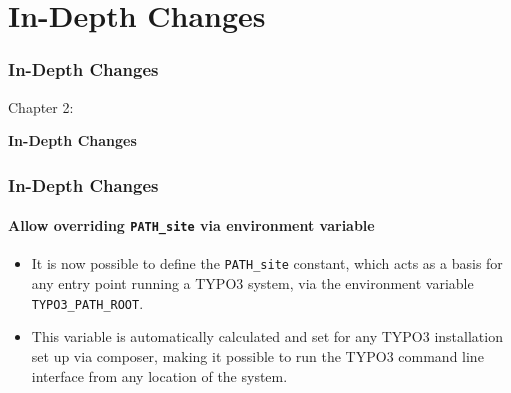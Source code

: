 %

\section{In-Depth Changes}
\begin{frame}[fragile]
	\frametitle{In-Depth Changes}

	\begin{center}\huge{Chapter 2:}\end{center}
	\begin{center}\huge{\color{typo3darkgrey}\textbf{In-Depth Changes}}\end{center}

\end{frame}


\begin{frame}[fragile]
	\frametitle{In-Depth Changes}
	\framesubtitle{Allow overriding \texttt{PATH\_site} via environment variable}

	\begin{itemize}
		\item It is now possible to define the \texttt{PATH\_site} constant, which acts as a basis
			for any entry point running a TYPO3 system, via the environment variable
			\texttt{TYPO3\_PATH\_ROOT}.

		\item This variable is automatically calculated and set for any TYPO3 installation set up
			via composer, making it possible to run the TYPO3 command line interface from any
			location of the system.

	\end{itemize}

\end{frame}


